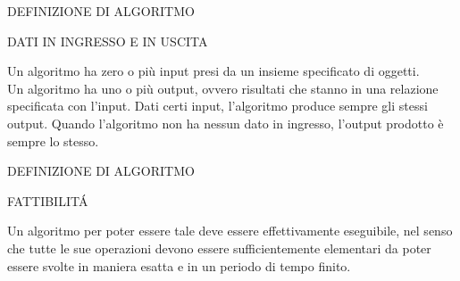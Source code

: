 \documentclass[aspectratio=1610]{beamer}
\begin{document}
\begin{frame}{DEFINIZIONE DI ALGORITMO}
    \begin{alertblock}{DATI IN INGRESSO E IN USCITA}
        \begin{minipage}{0.98\linewidth}
            \justifying
            Un algoritmo ha zero o più input presi da un insieme specificato di oggetti.\\
            Un algoritmo ha uno o più output, ovvero risultati che stanno in una relazione 
            specificata con l’input. Dati certi input, l’algoritmo produce sempre gli stessi output.
            Quando l’algoritmo non ha nessun dato in ingresso, l’output prodotto è sempre lo stesso.
            \bigskip
        \end{minipage}
    \end{alertblock}
\end{frame}

\begin{frame}{DEFINIZIONE DI ALGORITMO}
    \begin{alertblock}{FATTIBILIT\'A}
        \begin{minipage}{0.98\linewidth}
            \justifying
            Un algoritmo per poter essere tale deve essere effettivamente eseguibile, nel senso che
            tutte le sue operazioni devono essere sufficientemente elementari da poter
            essere svolte in maniera esatta e in un periodo di tempo finito.
            \bigskip
        \end{minipage}
    \end{alertblock}
\end{frame}
\end{document}

